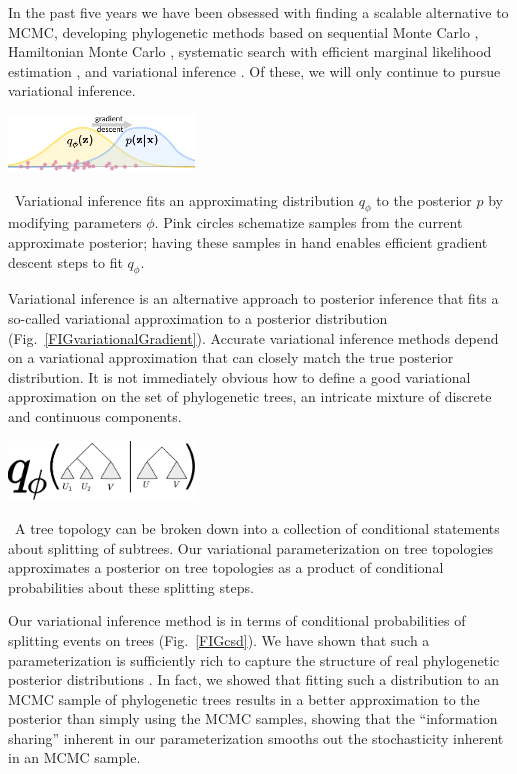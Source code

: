 \documentclass[nobib]{tufte-handout}
\begin{document}
In the past five years we have been obsessed with finding a scalable alternative to MCMC, developing phylogenetic methods based on
sequential Monte Carlo \cite{Dinh2017-sh,Fourment2017-an,Claywell2018-zg},
Hamiltonian Monte Carlo \cite{Dinh2017-oj},
systematic search \cite{Whidden2018-db} with efficient marginal likelihood estimation \cite{Fourment2018-xx},
and variational inference \cite{Zhang2018-lw,Zhang2018-mm}.
Of these, we will only continue to pursue variational inference.

\begin{marginfigure}[0.in]%
  \includegraphics[width=1.95in]{variational-gradient}
  \caption{\
    Variational inference fits an approximating distribution $q_\phi$ to the posterior $p$ by modifying parameters $\phi$.
    Pink circles schematize samples from the current approximate posterior; having these samples in hand enables efficient gradient descent steps to fit $q_\phi$.
    }
  \label{FIGvariationalGradient}
\end{marginfigure}%

Variational inference is an alternative approach to posterior inference that fits a so-called variational approximation to a posterior distribution (Fig.~\ref{FIGvariationalGradient}).
Accurate variational inference methods depend on a variational approximation that can closely match the true posterior distribution.
It is not immediately obvious how to define a good variational approximation on the set of phylogenetic trees, an intricate mixture of discrete and continuous components.

\begin{marginfigure}[0.7in]%
  \includegraphics[width=1.95in]{csd}
  \caption{\
    A tree topology can be broken down into a collection of conditional statements about splitting of subtrees.
    Our variational parameterization on tree topologies approximates a posterior on tree topologies as a product of conditional probabilities about these splitting steps.
    }
  \label{FIGcsd}
\end{marginfigure}%

Our variational inference method is in terms of conditional probabilities of splitting events on trees (Fig.~\ref{FIGcsd}).
We have shown that such a parameterization is sufficiently rich to capture the structure of real phylogenetic posterior distributions \cite{Zhang2018-mm}.
In fact, we showed that fitting such a distribution to an MCMC sample of phylogenetic trees results in a better approximation to the posterior than simply using the MCMC samples, showing that the ``information sharing'' inherent in our parameterization smooths out the stochasticity inherent in an MCMC sample.
\end{document}
